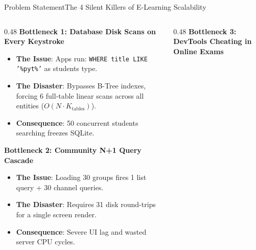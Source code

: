 \documentclass[aspectratio=169,10pt]{beamer}
\begin{document}
\begin{frame}[t]{Problem Statement}{The 4 Silent Killers of E-Learning Scalability}
  \begin{columns}[t]
    \begin{column}{0.48\textwidth}
      {\fontsize{9.0}{11.0}\selectfont\textbf{\textcolor{KoinexaRed}{Bottleneck 1: Database Disk Scans on Every Keystroke}}}\par\vspace{1.5pt}
      \begin{itemize}\setlength{\itemsep}{1.0pt}
        \item {\fontsize{8.0}{9.8}\selectfont \textbf{The Issue}: Apps run: \texttt{WHERE title LIKE '\%pyt\%'} as students type.}
        \item {\fontsize{8.0}{9.8}\selectfont \textbf{The Disaster}: Bypasses B-Tree indexes, forcing 6 full-table linear scans across all entities ($O(N \cdot K_{\text{tables}})$).}
        \item {\fontsize{8.0}{9.8}\selectfont \textbf{Consequence}: 50 concurrent students searching freezes SQLite.}
      \end{itemize}
      \vspace{0.15cm}
      {\fontsize{9.0}{11.0}\selectfont\textbf{\textcolor{KoinexaRed}{Bottleneck 2: Community N+1 Query Cascade}}}\par\vspace{1.5pt}
      \begin{itemize}\setlength{\itemsep}{1.0pt}
        \item {\fontsize{8.0}{9.8}\selectfont \textbf{The Issue}: Loading 30 groups fires 1 list query + 30 channel queries.}
        \item {\fontsize{8.0}{9.8}\selectfont \textbf{The Disaster}: Requires 31 disk round-trips for a single screen render.}
        \item {\fontsize{8.0}{9.8}\selectfont \textbf{Consequence}: Severe UI lag and wasted server CPU cycles.}
      \end{itemize}
    \end{column}
    \begin{column}{0.48\textwidth}
      {\fontsize{9.0}{11.0}\selectfont\textbf{\textcolor{KoinexaOrange}{Bottleneck 3: DevTools Cheating in Online Exams}}}\par\vspace{1.5pt}

\end{column}
\end{columns}
\end{frame}
\end{document}
